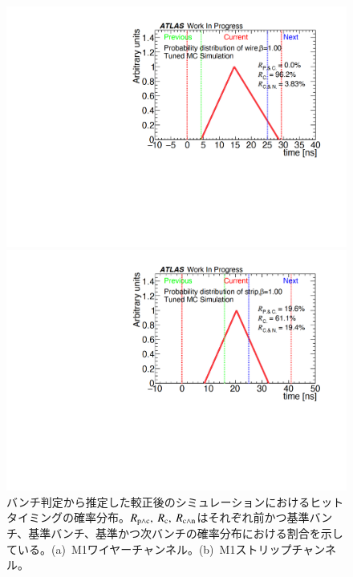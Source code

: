 \begin{figure}[H]
    \begin{minipage}{0.49\hsize}
    \centering   
    \includegraphics[width=\textwidth,page=1]{img/rec/rec_tune_w.pdf}
    \subcaption{}
    \end{minipage}
    \begin{minipage}{0.49\hsize}
    \centering   
    \includegraphics[width=\textwidth,page=1]{img/rec/rec_tune_s.pdf}
    \subcaption{}
    \end{minipage}
    \caption[バンチ判定から推定した較正後のシミュレーションにおけるヒットタイミングの確率分布]{バンチ判定から推定した較正後のシミュレーションにおけるヒットタイミングの確率分布。$R_{\rm{p{\land}c}},~R_{\rm{c}},~R_{\rm{c{\land}n}}$はそれぞれ前かつ基準バンチ、基準バンチ、基準かつ次バンチの確率分布における割合を示している。(a)~M1ワイヤーチャンネル。(b)~M1ストリップチャンネル。}\label{fig:rectune}
\end{figure}

